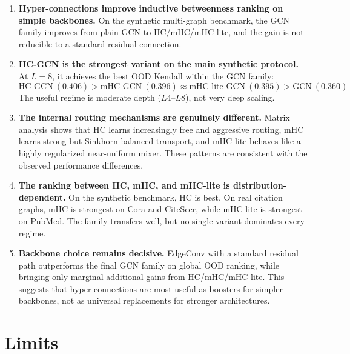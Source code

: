 \documentclass[11pt,a4paper]{article}
\begin{document}
\begin{enumerate}
  \item \textbf{Hyper-connections improve inductive betweenness ranking on simple backbones.}
        On the synthetic multi-graph benchmark, the GCN family improves from
        plain GCN to HC/mHC/mHC-lite, and the gain is not reducible to a
        standard residual connection.

  \item \textbf{HC-GCN is the strongest variant on the main synthetic protocol.}
        At $L=8$, it achieves the best OOD Kendall within the GCN family:
        \[
          \text{HC-GCN}\ (0.406) > \text{mHC-GCN}\ (0.396)
          \approx \text{mHC-lite-GCN}\ (0.395) > \text{GCN}\ (0.360)
        \]
        The useful regime is moderate depth ($L4$--$L8$), not very deep scaling.

  \item \textbf{The internal routing mechanisms are genuinely different.}
        Matrix analysis shows that HC learns increasingly free and aggressive
        routing, mHC learns strong but Sinkhorn-balanced transport, and
        mHC-lite behaves like a highly regularized near-uniform mixer.
        These patterns are consistent with the observed performance differences.

  \item \textbf{The ranking between HC, mHC, and mHC-lite is distribution-dependent.}
        On the synthetic benchmark, HC is best. On real citation graphs,
        mHC is strongest on Cora and CiteSeer, while mHC-lite is strongest on
        PubMed. The family transfers well, but no single variant dominates
        every regime.

  \item \textbf{Backbone choice remains decisive.}
        EdgeConv with a standard residual path outperforms the final GCN family
        on global OOD ranking, while bringing only marginal additional gains
        from HC/mHC/mHC-lite. This suggests that hyper-connections are most
        useful as boosters for simpler backbones, not as universal replacements
        for stronger architectures.
\end{enumerate}

\section{Limits}
\end{document}
